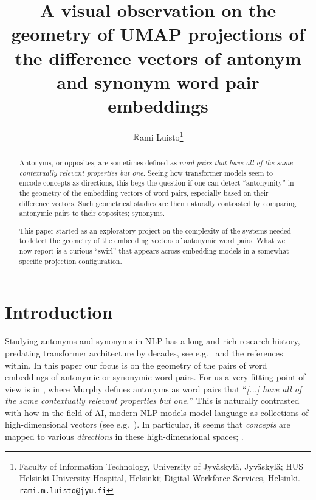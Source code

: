 \documentclass[a4paper]{article}
\title{A visual observation on the geometry of UMAP projections of the difference vectors of antonym and synonym word pair embeddings}
\author{$\mathbb R$ami Luisto\thanks{%
  Faculty of Information Technology, University of Jyv\"askyl\"a, Jyv\"askyl\"a;
  HUS Helsinki University Hospital, Helsinki;
  Digital Workforce Services, Helsinki.
  \texttt{rami.m.luisto@jyu.fi}}}
\theoremstyle{definition}
\theoremstyle{remark}
\numberwithin{equation}{section}
\begin{document}
\maketitle

\begin{abstract}
  Antonyms, or opposites, are sometimes defined as \emph{word pairs that have all of the same contextually relevant properties but one}. Seeing how transformer models seem to encode concepts as directions, this begs the question if one can detect ``antonymity'' in the geometry of the embedding vectors of word pairs, especially based on their difference vectors. Such geometrical studies are then naturally contrasted by comparing antonymic pairs to their opposites; synonyms.

  This paper started as an exploratory project on the complexity of the systems needed to detect the geometry of the embedding vectors of antonymic word pairs. What we now report is a curious ``swirl'' that appears across embedding models in a somewhat specific projection configuration.
\end{abstract}

\section{Introduction}

Studying antonyms and synonyms in NLP has a long and rich research history, predating transformer architecture by decades, see e.g.\ \cite{Nguyen2016Contrast} and the references within. In this paper our focus is on the geometry of the pairs of word embeddings of antonymic or synonymic word pairs.
For us a very fitting point of view is in \cite[p.\ 170]{murphy2003semantic}, where Murphy defines antonyms as word pairs that ``\emph{[...] have all of the same contextually relevant properties but one.}'' This is naturally contrasted with how in the field of AI, modern NLP models model language as collections of high-dimensional vectors (see e.g.\ \cite{bolukbasi2016man,vaswani2017attention}). In particular, it seems that \emph{concepts} are mapped to various \emph{directions} in these high-dimensional spaces; \cite{bolukbasi2016man,elhage2022toy}. 
\end{document}
